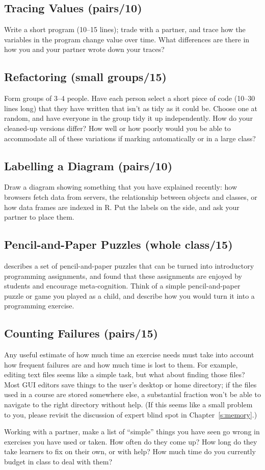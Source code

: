 \subsection*{Tracing Values (pairs/10)}

Write a short program (10--15 lines); trade with a partner, and trace how
the variables in the program change value over time. What differences
are there in how you and your partner wrote down your traces?

\subsection*{Refactoring (small groups/15)}

Form groups of 3--4 people. Have each person select a short piece of code
(10--30 lines long) that they have written that isn't as tidy as it could
be. Choose one at random, and have everyone in the group tidy it up
independently. How do your cleaned-up versions differ? How well or how
poorly would you be able to accommodate all of these variations if
marking automatically or in a large class?

\subsection*{Labelling a Diagram (pairs/10)}

Draw a diagram showing something that you have explained recently: how
browsers fetch data from servers, the relationship between objects and
classes, or how data frames are indexed in R. Put the labels on the
side, and ask your partner to place them.

\subsection*{Pencil-and-Paper Puzzles (whole class/15)}

\cite{Butl2017} describes a set of pencil-and-paper puzzles that can
be turned into introductory programming assignments, and found that
these assignments are enjoyed by students and encourage meta-cognition.
Think of a simple pencil-and-paper puzzle or game you played as a child,
and describe how you would turn it into a programming exercise.

\subsection*{Counting Failures (pairs/15)}

Any useful estimate of how much time an exercise needs must take into
account how frequent failures are and how much time is lost to them. For
example, editing text files seems like a simple task, but what about
finding those files? Most GUI editors save things to the user's desktop
or home directory; if the files used in a course are stored somewhere
else, a substantial fraction won't be able to navigate to the right
directory without help. (If this seems like a small problem to you,
please revisit the discussion of expert blind spot in
Chapter~\ref{s:memory}.)

Working with a partner, make a list of ``simple'' things you have seen go
wrong in exercises you have used or taken. How often do they come up?
How long do they take learners to fix on their own, or with help? How
much time do you currently budget in class to deal with them?
